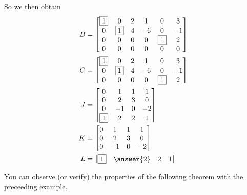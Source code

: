 \documentclass{ximera}
\begin{document}
\begin{example}
  So we then obtain
  \begin{align*}
    B&=
       \begin{bmatrix}
         \leading{1} & 0 & 2 & 1 & 0 & 3 \\
         0 & \leading{1} & 4 & -6 & 0 & -1 \\
         0 & 0 & 0 & 0 & \leading{1} & 2 \\
         0 & 0 & 0 & 0 & 0 & 0
       \end{bmatrix}\\
    C&=
       \begin{bmatrix}
         \leading{1} & 0 & 2 & 1 & 0 & 3 \\
         0 & \leading{1} & 4 & -6 & 0 & -1 \\
         0 & 0 & 0 & 0 & \leading{1} & 2
       \end{bmatrix}\\
    J&=
       \begin{bmatrix}
         0 & 1 & 1 & 1\\
         0 & 2 & 3 & 0 \\
         0 & -1 & 0 & -2 \\
         \leading{1} & 2 & 2 & 1
       \end{bmatrix}\\
    K&=
       \begin{bmatrix}
         0 & 1 & 1 & 1\\
         0 & 2 & 3 & 0 \\
         0 & -1 & 0 & -2
       \end{bmatrix}\\
    L&=
       \begin{bmatrix}
         \leading{1} & \answer{2} & 2 & 1
       \end{bmatrix}
  \end{align*}
\end{example}

You can observe (or verify) the properties of the following theorem
with the preceeding example.
\end{document}

